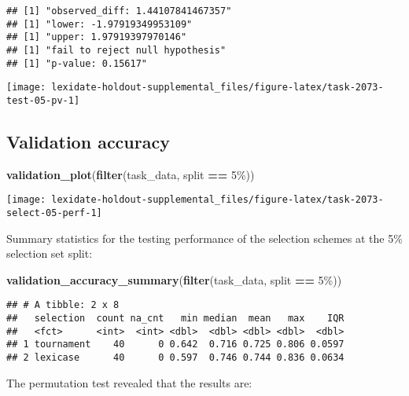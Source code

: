 \documentclass[
]{book}
\newenvironment{Shaded}{\begin{snugshade}}{\end{snugshade}}
\newcommand{\FunctionTok}[1]{\textcolor[rgb]{0.13,0.29,0.53}{\textbf{#1}}}
\newcommand{\NormalTok}[1]{#1}
\newcommand{\SpecialCharTok}[1]{\textcolor[rgb]{0.81,0.36,0.00}{\textbf{#1}}}
\newcommand{\StringTok}[1]{\textcolor[rgb]{0.31,0.60,0.02}{#1}}
\begin{document}
\begin{verbatim}
## [1] "observed_diff: 1.44107841467357"
## [1] "lower: -1.97919349953109"
## [1] "upper: 1.97919397970146"
## [1] "fail to reject null hypothesis"
## [1] "p-value: 0.15617"
\end{verbatim}

\texttt{[image: lexidate-holdout-supplemental\_files/figure-latex/task-2073-test-05-pv-1]}

\hypertarget{validation-accuracy-40}{%
\subsection{Validation accuracy}\label{validation-accuracy-40}}

\begin{Shaded}
\begin{Highlighting}[]
\FunctionTok{validation\_plot}\NormalTok{(}\FunctionTok{filter}\NormalTok{(task\_data, split }\SpecialCharTok{==} \StringTok{\textquotesingle{}5\%\textquotesingle{}}\NormalTok{))}
\end{Highlighting}
\end{Shaded}

\texttt{[image: lexidate-holdout-supplemental\_files/figure-latex/task-2073-select-05-perf-1]}

Summary statistics for the testing performance of the selection schemes at the 5\% selection set split:

\begin{Shaded}
\begin{Highlighting}[]
\FunctionTok{validation\_accuracy\_summary}\NormalTok{(}\FunctionTok{filter}\NormalTok{(task\_data, split }\SpecialCharTok{==} \StringTok{\textquotesingle{}5\%\textquotesingle{}}\NormalTok{))}
\end{Highlighting}
\end{Shaded}

\begin{verbatim}
## # A tibble: 2 x 8
##   selection  count na_cnt   min median  mean   max    IQR
##   <fct>      <int>  <int> <dbl>  <dbl> <dbl> <dbl>  <dbl>
## 1 tournament    40      0 0.642  0.716 0.725 0.806 0.0597
## 2 lexicase      40      0 0.597  0.746 0.744 0.836 0.0634
\end{verbatim}

The permutation test revealed that the results are:
\end{document}

